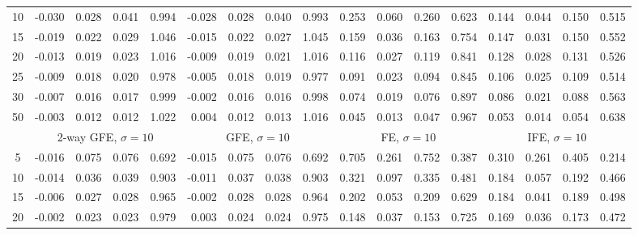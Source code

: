 \begin{tabular}{c r r r r r r r r r r r r r r r r}
10 &     -0.030 &      0.028 &      0.041 &      0.994 &     -0.028 &      0.028 &      0.040 &      0.993 &      0.253 &      0.060 &      0.260 &      0.623 &      0.144 &      0.044 &      0.150 &      0.515\\
15 &     -0.019 &      0.022 &      0.029 &      1.046 &     -0.015 &      0.022 &      0.027 &      1.045 &      0.159 &      0.036 &      0.163 &      0.754 &      0.147 &      0.031 &      0.150 &      0.552\\
20 &     -0.013 &      0.019 &      0.023 &      1.016 &     -0.009 &      0.019 &      0.021 &      1.016 &      0.116 &      0.027 &      0.119 &      0.841 &      0.128 &      0.028 &      0.131 &      0.526\\
25 &     -0.009 &      0.018 &      0.020 &      0.978 &     -0.005 &      0.018 &      0.019 &      0.977 &      0.091 &      0.023 &      0.094 &      0.845 &      0.106 &      0.025 &      0.109 &      0.514\\
30 &     -0.007 &      0.016 &      0.017 &      0.999 &     -0.002 &      0.016 &      0.016 &      0.998 &      0.074 &      0.019 &      0.076 &      0.897 &      0.086 &      0.021 &      0.088 &      0.563\\
50 &     -0.003 &      0.012 &      0.012 &      1.022 &      0.004 &      0.012 &      0.013 &      1.016 &      0.045 &      0.013 &      0.047 &      0.967 &      0.053 &      0.014 &      0.054 &      0.638\\[0pt]
 & \multicolumn{ 4 }{c}{ 2-way GFE, $\sigma{=}1$0} & \multicolumn{ 4 }{c}{ GFE, $\sigma{=}1$0} & \multicolumn{ 4 }{c}{ FE, $\sigma{=}1$0} & \multicolumn{ 4 }{c}{ IFE, $\sigma{=}1$0}\\[-3pt]
 \cmidrule(lr){2-5}  \cmidrule(lr){6-9}  \cmidrule(lr){10-13}  \cmidrule(lr){14-17}
5 &     -0.016 &      0.075 &      0.076 &      0.692 &     -0.015 &      0.075 &      0.076 &      0.692 &      0.705 &      0.261 &      0.752 &      0.387 &      0.310 &      0.261 &      0.405 &      0.214\\
10 &     -0.014 &      0.036 &      0.039 &      0.903 &     -0.011 &      0.037 &      0.038 &      0.903 &      0.321 &      0.097 &      0.335 &      0.481 &      0.184 &      0.057 &      0.192 &      0.466\\
15 &     -0.006 &      0.027 &      0.028 &      0.965 &     -0.002 &      0.028 &      0.028 &      0.964 &      0.202 &      0.053 &      0.209 &      0.629 &      0.184 &      0.041 &      0.189 &      0.498\\
20 &     -0.002 &      0.023 &      0.023 &      0.979 &      0.003 &      0.024 &      0.024 &      0.975 &      0.148 &      0.037 &      0.153 &      0.725 &      0.169 &      0.036 &      0.173 &      0.472\\

\end{tabular}
